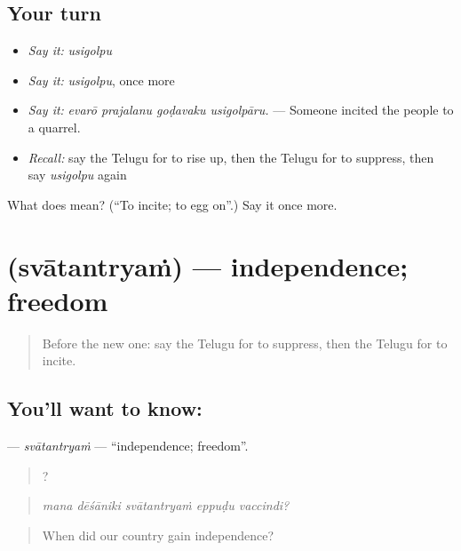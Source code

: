 \subsection*{Your turn}
\begin{itemize}
\raggedright
  \item \emph{Say it:} \emph{usigolpu}
  \item \emph{Say it:} \emph{usigolpu}, once more
  \item \emph{Say it:} \emph{evarō prajalanu goḍavaku usigolpāru.} — Someone incited the people to a quarrel.
  \item \emph{Recall:} say the Telugu for to rise up, then the Telugu for to suppress, then say \emph{usigolpu} again
\end{itemize}

\begin{tcolorbox}[breakable,colback=teal!4,colframe=teal!35!black,title={Before you move on}]
What does  mean? (\textquotedblleft{}To incite; to egg on\textquotedblright{}.) Say it once more.
\end{tcolorbox}
\section[\texorpdfstring{\te{స్వాతంత్ర్యం} (svātantryaṁ)}{స్వాతంత్ర్యం (svātantryaṁ)}]{ (svātantryaṁ) — independence; freedom}

\label{lesson:TE-C363-svatantryam}



\begin{quote}
Before the new one: say the Telugu for to suppress, then the Telugu for to incite.
\end{quote}

\subsection*{You'll want to know: }
\textbf{} — \emph{svātantryaṁ} — \textquotedblleft{}independence; freedom\textquotedblright{}.

\begin{quote}
    ?
\end{quote}

\begin{quote}
\emph{mana dēśāniki svātantryaṁ eppuḍu vaccindi?}
\end{quote}

\begin{quote}
When did our country gain independence?
\end{quote}

